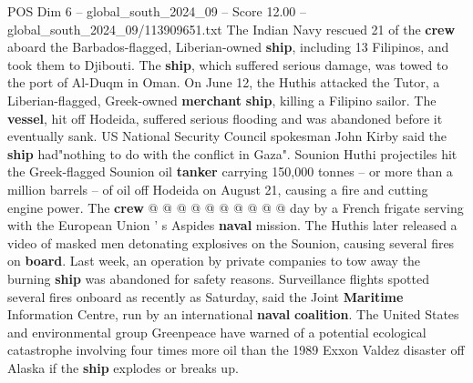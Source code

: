 \begin{textsample}{POS Dim 6 – global\_south\_2024\_09 – Score 12.00 – global\_south\_2024\_09/113909651.txt}
The Indian Navy rescued 21 of the \textbf{crew} aboard the Barbados-flagged, Liberian-owned \textbf{ship}, including 13 Filipinos, and took them to Djibouti.
The \textbf{ship}, which suffered serious damage, was towed to the port of Al-Duqm in Oman.
On June 12, the Huthis attacked the Tutor, a Liberian-flagged, Greek-owned \textbf{merchant} \textbf{ship}, killing a Filipino sailor.
The \textbf{vessel}, hit off Hodeida, suffered serious flooding and was abandoned before it eventually sank.
US National Security Council spokesman John Kirby said the \textbf{ship} had"nothing to do with the conflict in Gaza".
Sounion Huthi projectiles hit the Greek-flagged Sounion oil \textbf{tanker} carrying 150,000 tonnes -- or more than a million barrels -- of oil off Hodeida on August 21, causing a fire and cutting engine power.
The \textbf{crew} @ @ @ @ @ @ @ @ @ @ day by a French frigate serving with the European Union ' s Aspides \textbf{naval} mission.
The Huthis later released a video of masked men detonating explosives on the Sounion, causing several fires on \textbf{board}.
Last week, an operation by private companies to tow away the burning \textbf{ship} was abandoned for safety reasons.
Surveillance flights spotted several fires onboard as recently as Saturday, said the Joint \textbf{Maritime} Information Centre, run by an international \textbf{naval} \textbf{coalition}.
The United States and environmental group Greenpeace have warned of a potential ecological catastrophe involving four times more oil than the 1989 Exxon Valdez disaster off Alaska if the \textbf{ship} explodes or breaks up.

\end{textsample}
